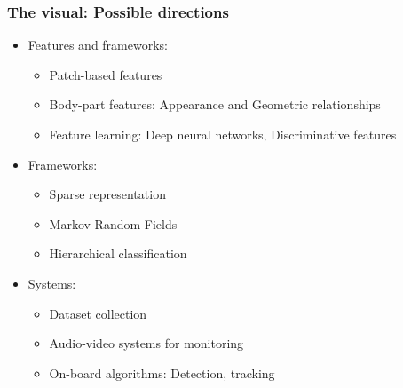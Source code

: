 \documentclass[mathserif]{beamer}
\begin{document}
\begin{frame}
\frametitle{The visual: Possible directions}
\begin{itemize}
\item<2-> Features and frameworks: 
\begin{itemize}
\item Patch-based features 
\item Body-part features: Appearance and Geometric relationships
\item Feature learning: Deep neural networks, Discriminative features
\end{itemize}
\item<3-> Frameworks:
\begin{itemize}
\item Sparse representation
\item Markov Random Fields
\item Hierarchical classification 
\end{itemize}
\item<4-> Systems:
\begin{itemize}
\item Dataset collection
\item Audio-video systems for monitoring
\item On-board algorithms: Detection, tracking
\end{itemize}
\end{itemize}
\end{frame}
\end{document}
